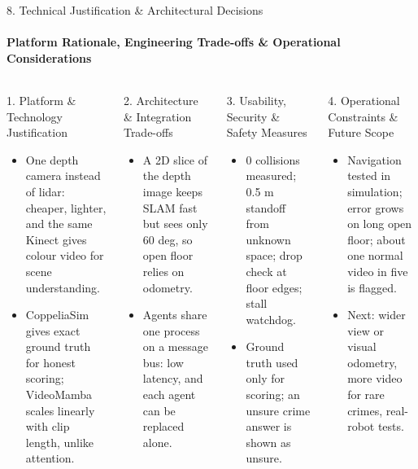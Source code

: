 \documentclass[aspectratio=169, 11pt]{beamer}
\begin{document}
\begin{frame}{8. Technical Justification \& Architectural Decisions}
    \framesubtitle{Platform Rationale, Engineering Trade-offs \& Operational Considerations}
    \begin{columns}[T]
        \begin{block}{1. Platform \& Technology Justification}
            \scriptsize
            \begin{itemize}
                \item One depth camera instead of lidar: cheaper, lighter, and the same Kinect gives colour video for scene understanding.
                \item CoppeliaSim gives exact ground truth for honest scoring; VideoMamba scales linearly with clip length, unlike attention.
            \end{itemize}
        \end{block}

        \begin{block}{2. Architecture \& Integration Trade-offs}
            \scriptsize
            \begin{itemize}
                \item A 2D slice of the depth image keeps SLAM fast but sees only 60 deg, so open floor relies on odometry.
                \item Agents share one process on a message bus: low latency, and each agent can be replaced alone.
            \end{itemize}
        \end{block}

        \begin{block}{3. Usability, Security \& Safety Measures}
            \scriptsize
            \begin{itemize}
                \item 0 collisions measured; 0.5 m standoff from unknown space; drop check at floor edges; stall watchdog.
                \item Ground truth used only for scoring; an unsure crime answer is shown as unsure.
            \end{itemize}
        \end{block}

        \begin{block}{4. Operational Constraints \& Future Scope}
            \scriptsize
            \begin{itemize}
                \item Navigation tested in simulation; error grows on long open floor; about one normal video in five is flagged.
                \item Next: wider view or visual odometry, more video for rare crimes, real-robot tests.
            \end{itemize}
        \end{block}
    \end{columns}
\end{frame}
\end{document}
